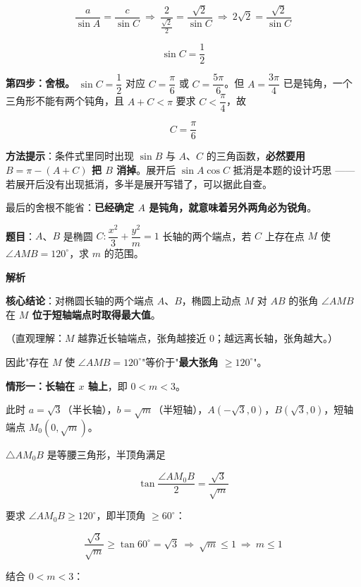 \[\frac a{\sin A}=\frac c{\sin C}\ \Longrightarrow\ \frac2{\frac{\sqrt2}2}=\frac{\sqrt2}{\sin C}\ \Longrightarrow\ 2\sqrt2=\frac{\sqrt2}{\sin C}\]

\[\sin C=\frac12\]

\textbf{第四步：舍根。} $\sin C=\dfrac12$ 对应 $C=\dfrac\pi6$ 或 $C=\dfrac{5\pi}6$。但 $A=\dfrac{3\pi}4$ 已是钝角，一个三角形不能有两个钝角，且 $A+C<\pi$ 要求 $C<\dfrac\pi4$，故

\[C=\frac\pi6\]


\begin{gktip}
\textbf{方法提示}：条件式里同时出现 $\sin B$ 与 $A$、$C$ 的三角函数，\textbf{必然要用 $B=\pi-(A+C)$ 把 $B$ 消掉}。展开后 $\sin A\cos C$ 抵消是本题的设计巧思 —— 若展开后没有出现抵消，多半是展开写错了，可以据此自查。

最后的舍根不能省：\textbf{已经确定 $A$ 是钝角，就意味着另外两角必为锐角}。
\end{gktip}

\par\medskip


\textbf{题目}：$A$、$B$ 是椭圆 $C:\dfrac{x^{2}}3+\dfrac{y^{2}}m=1$ 长轴的两个端点，若 $C$ 上存在点 $M$ 使 $\angle AMB=120^\circ$，求 $m$ 的范围。

\textbf{解析}

\textbf{核心结论}：对椭圆长轴的两个端点 $A$、$B$，椭圆上动点 $M$ 对 $AB$ 的张角 $\angle AMB$ 在 \textbf{$M$ 位于短轴端点时取得最大值}。

（直观理解：$M$ 越靠近长轴端点，张角越接近 $0$；越远离长轴，张角越大。）

因此"存在 $M$ 使 $\angle AMB=120^\circ$"等价于"\textbf{最大张角 $\ge120^\circ$}"。

\textbf{情形一：长轴在 $x$ 轴上}，即 $0<m<3$。

此时 $a=\sqrt3$（半长轴），$b=\sqrt m$（半短轴），$A\left(-\sqrt3,0\right)$，$B\left(\sqrt3,0\right)$，短轴端点 $M_0\left(0,\sqrt m\right)$。

$\triangle AM_0B$ 是等腰三角形，半顶角满足

\[\tan\frac{\angle AM_0B}2=\frac{\sqrt3}{\sqrt m}\]

要求 $\angle AM_0B\ge120^\circ$，即半顶角 $\ge60^\circ$：

\[\frac{\sqrt3}{\sqrt m}\ge\tan60^\circ=\sqrt3\ \Longrightarrow\ \sqrt m\le1\ \Longrightarrow\ m\le1\]

结合 $0<m<3$：

